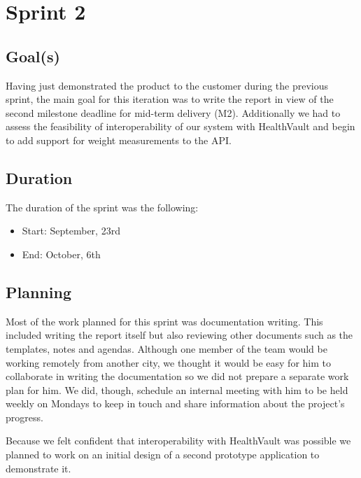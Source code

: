 
\chapter{Sprint 2}
\label{Sprint2}

\section{Goal(s)}
Having just demonstrated the product to the customer during the previous sprint, the main goal
for this iteration was to write the report in view of the second milestone deadline for mid-term delivery (M2).
Additionally we had to assess the feasibility of interoperability of our system with HealthVault
and begin to add support for weight measurements to the API.

\section{Duration}
The duration of the sprint was the following:
\begin{itemize}
\item Start: September, 23rd
\item End: October, 6th
\end{itemize}

\section{Planning}

Most of the work planned for this sprint was documentation writing.
This included writing the report itself but also reviewing other documents such as the
templates, notes and agendas. Although one member of the team would be working remotely
from another city, we thought it would be easy for him to collaborate in writing the documentation
so we did not prepare a separate work plan for him.
We did, though, schedule an internal meeting with him to be held weekly on Mondays
to keep in touch and share information about the project's progress.

Because we felt confident that interoperability with HealthVault was possible
we planned to work on an initial design of a second prototype application to demonstrate it.


